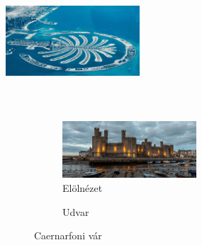 \documentclass{article}
\begin{document}
\listoffigures
\clearpage
\hulipsum[1]
\includegraphics[width=5cm,height=5cm]{Kepek/Palm_Jumeirah.png}
\hulipsum[2-3]
\begin{figure}
\centering
\begin{subfigure}{5cm}
\centering
\includegraphics[width=5cm]{Kepek/Caernarfon_castle_front.png}
\caption{Elölnézet}
\label{fig:Caernarfon_front}
\end{subfigure}
\hfill
\begin{subfigure}{5cm}
\centering
{}
\caption{Udvar}
\label{fig:Caernarfon_court}
\end{subfigure}
\caption{Caernarfoni vár}
\label{fig:Caernarfon_castle}
\end{figure}
\end{document}
